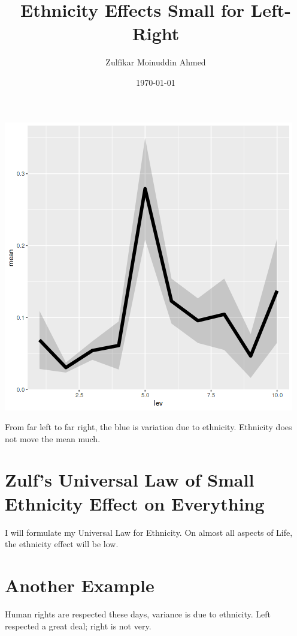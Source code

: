 \documentclass{amsart}
\title{Ethnicity Effects Small for Left-Right}
\author{Zulfikar Moinuddin Ahmed}
\date{\today}
\begin{document}
\maketitle

\includegraphics[scale=0.8]{ethleftright.png}

From far left to far right, the blue is variation due to ethnicity.  Ethnicity does not move the mean much.

\section{Zulf's Universal Law of Small Ethnicity Effect on Everything}

I will formulate my Universal Law for Ethnicity.  On almost all aspects of Life, the ethnicity effect will be low.

\section{Another Example}

Human rights are respected these days, variance is due to ethnicity. Left respected a great deal; right is not very.
\end{document}
